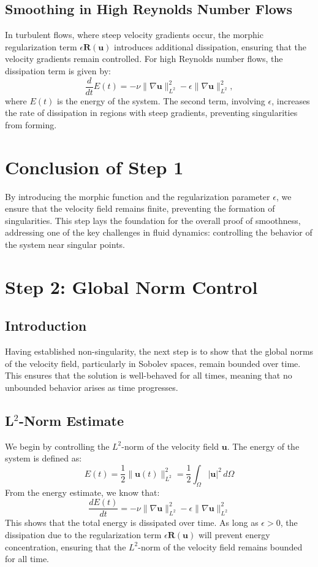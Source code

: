 \documentclass{article}
\begin{document}
\subsection*{Smoothing in High Reynolds Number Flows}

In turbulent flows, where steep velocity gradients occur, the morphic regularization term \( \epsilon \mathbf{R}(\mathbf{u}) \) introduces additional dissipation, ensuring that the velocity gradients remain controlled. For high Reynolds number flows, the dissipation term is given by:
\[
\frac{d}{dt} E(t) = - \nu \|\nabla \mathbf{u}\|_{L^2}^2 - \epsilon \|\nabla \mathbf{u}\|_{L^2}^2,
\]
where \( E(t) \) is the energy of the system. The second term, involving \( \epsilon \), increases the rate of dissipation in regions with steep gradients, preventing singularities from forming.

\section*{Conclusion of Step 1}

By introducing the morphic function and the regularization parameter \( \epsilon \), we ensure that the velocity field remains finite, preventing the formation of singularities. This step lays the foundation for the overall proof of smoothness, addressing one of the key challenges in fluid dynamics: controlling the behavior of the system near singular points.

\section*{Step 2: Global Norm Control}

\subsection*{Introduction}

Having established non-singularity, the next step is to show that the global norms of the velocity field, particularly in Sobolev spaces, remain bounded over time. This ensures that the solution is well-behaved for all times, meaning that no unbounded behavior arises as time progresses.

\subsection*{L\(^2\)-Norm Estimate}

We begin by controlling the \( L^2 \)-norm of the velocity field \( \mathbf{u} \). The energy of the system is defined as:
\[
E(t) = \frac{1}{2} \|\mathbf{u}(t)\|_{L^2}^2 = \frac{1}{2} \int_{\Omega} |\mathbf{u}|^2 \, d\Omega
\]
From the energy estimate, we know that:
\[
\frac{dE(t)}{dt} = -\nu \|\nabla \mathbf{u}\|_{L^2}^2 - \epsilon \|\nabla \mathbf{u}\|_{L^2}^2
\]
This shows that the total energy is dissipated over time. As long as \( \epsilon > 0 \), the dissipation due to the regularization term \( \epsilon \mathbf{R}(\mathbf{u}) \) will prevent energy concentration, ensuring that the \( L^2 \)-norm of the velocity field remains bounded for all time.
\end{document}
